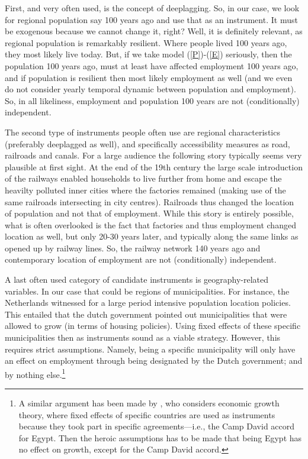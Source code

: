 \documentclass[fleqn,10pt]{SelfArx} %
\begin{document}
First, and very often used, is the concept of deeplagging. So, in our case, we
look for regional population say 100 years ago and use that as an instrument. It
must be exogenous because we cannot change it, right? Well, it is definitely
relevant, as regional population is remarkably resilient. Where people lived
100 years ago, they most likely live today. But, if we take model
(\ref{P})-(\ref{E}) seriously, then the population 100 years ago, must at least
have affected employment 100 years ago, and if population is resilient then most
likely employment as well (and we even do not consider yearly temporal dynamic
between population and employment). So, in all likeliness, employment and
population 100 years are not (conditionally) independent.

The second type of instruments people often use are regional characteristics
(preferably deeplagged as well), and specifically accessibility measures as
road, railroads and canals. For a large audience the following story typically seems very plausible at first
sight. At the end of the 19th century the large scale introduction of the
railways enabled households to live further from home and escape the heavilty
polluted inner cities where the factories remained (making use of the same
railroads intersecting in city centres). Railroads thus changed the location of
population and not that of employment. While this story is entirely possible,
what is often overlooked is the fact that factories and thus employment changed location as
well, but only 20-30 years later, and typically along the same links as opened
up by railway lines. So, the railway network 140 years ago and contemporary
location of employment are not (conditionally) independent.

A last often used category of candidate instruments is geography-related
variables. In our case that could be regions of municipalities. For instance,
the Netherlands witnessed for a large period intensive population location
policies. This entailed that the dutch government pointed out municipalities
that were allowed to grow (in terms of housing policies). Using fixed effects of
these specific municipalities then as instruments sound as a viable strategy.
However, this requires strict assumptions. Namely, being a specific municipality
will only have an effect on employment through being designated by the Dutch
government; and by nothing else.\footnote{A similar argument has been made by
  \cite{deaton2010instruments}, who considers economic growth theory, where fixed
  effects of specific countries are used as instruments because they took part
  in specific agreements---i.e., the Camp David accord for Egypt. Then the
  heroic assumptions has to be made that being Egypt has no effect on growth,
  except for the Camp David accord.}
\end{document}
